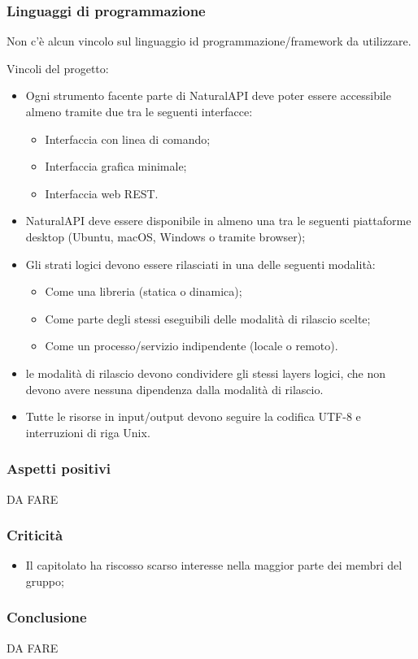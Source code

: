         \subsubsection{Linguaggi di programmazione}
        Non c'è alcun vincolo sul linguaggio id programmazione/framework da utilizzare.
        
Vincoli del progetto:
   	\begin{itemize}
   		\item Ogni strumento facente parte di NaturalAPI deve poter essere accessibile almeno tramite due tra le seguenti interfacce:
   			\begin{itemize}
   				\item Interfaccia con linea di comando;
   				\item Interfaccia grafica minimale;
   				\item Interfaccia web REST.
   			\end{itemize}
   			\item NaturalAPI deve essere disponibile in almeno una tra le seguenti piattaforme desktop (Ubuntu, macOS, Windows o tramite browser);
   			\item Gli strati logici devono essere rilasciati in una delle seguenti modalità:
   				\begin{itemize}
   					\item Come una libreria (statica o dinamica);
   					\item Come parte degli stessi eseguibili delle modalità di rilascio scelte;
   					\item Come un processo/servizio indipendente (locale o remoto).
   				\end{itemize}
   			\item le modalità di rilascio devono condividere gli stessi layers logici, che non devono avere nessuna dipendenza dalla modalità di rilascio.
   			\item Tutte le risorse in input/output devono seguire la codifica UTF-8 e interruzioni di riga Unix.
   	\end{itemize} 
    
    \subsubsection{Aspetti positivi}
    DA FARE
    \subsubsection{Criticità}
    \begin{itemize}
    		\item Il capitolato ha riscosso scarso interesse nella maggior parte dei membri del gruppo;
    		
    \end{itemize}
    \subsubsection{Conclusione}
    DA FARE